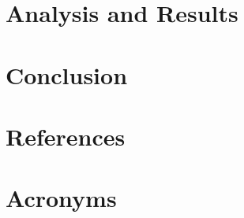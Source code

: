 \documentclass[SE,authoryear,toc]{lsstdoc}
\begin{document}
\section{Analysis and Results}

\section{Conclusion}

\appendix
\section{References} \label{sec:bib}
\renewcommand{\refname}{} %


\section{Acronyms} \label{sec:acronyms}

\end{document}
